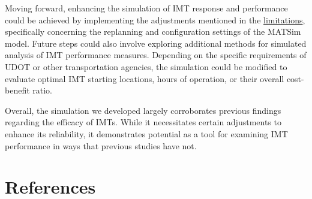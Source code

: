 \documentclass[fancy, oneside, mastersfancy, ms]{byuthesis}
\begin{document}
Moving forward, enhancing the simulation of IMT response and performance
could be achieved by implementing the adjustments mentioned in the
\protect\hyperlink{sec-limitations}{limitations}, specifically
concerning the replanning and configuration settings of the MATSim
model. Future steps could also involve exploring additional methods for
simulated analysis of IMT performance measures. Depending on the
specific requirements of UDOT or other transportation agencies, the
simulation could be modified to evaluate optimal IMT starting locations,
hours of operation, or their overall cost-benefit ratio.

Overall, the simulation we developed largely corroborates previous
findings regarding the efficacy of IMTs. While it necessitates certain
adjustments to enhance its reliability, it demonstrates potential as a
tool for examining IMT performance in ways that previous studies have
not.


\hypertarget{references}{%
\chapter*{References}\label{references}}

\end{document}
